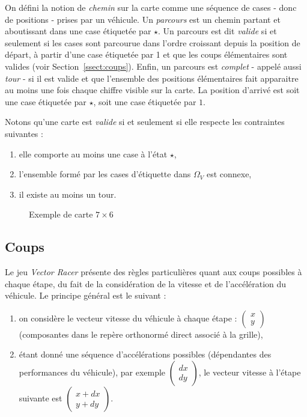 On défini la notion de \textit{chemin} sur la carte comme une séquence de cases - donc de positions - prises par un véhicule. Un \textit{parcours} est un chemin partant et aboutissant dans une case étiquetée par $\star$. Un parcours est dit \textit{valide} si et seulement si les cases sont parcourue dans l'ordre croissant depuis la position de départ, à partir d'une case étiquetée par 1 et que les coups élémentaires sont valides (voir Section~\vref{ssect:coups}). Enfin, un parcours est \textit{complet} - appelé aussi \textit{tour} - si il est valide et que l'ensemble des positions élémentaires fait apparaitre au moins une fois chaque chiffre visible sur la carte. La position d'arrivé est soit une case étiquetée par $\star$, soit une case étiquetée par $1$.

Notons qu'une carte est \textit{valide} si et seulement si elle respecte les contraintes suivantes :
\begin{enumerate}
\item elle comporte au moins une case à l'état $\star$,
\item l'ensemble formé par les cases d'étiquette dans $\Omega_V$ est connexe,
\item il existe au moins un tour.
\end{enumerate}

\begin{figure}[ht]
	\centering
	\theverbbox
	\caption{Exemple de carte $7\times 6$}
	\label{fig:ex_carte}
\end{figure}

\subsection{Coups}
\label{ssect:coups}

Le jeu \textit{Vector Racer} présente des règles particulières quant aux coups possibles à chaque étape, du fait de la considération de la vitesse et de l'accélération du véhicule. Le principe général est le suivant :
\begin{enumerate}
\item on considère le vecteur vitesse du véhicule à chaque étape : $\begin{pmatrix}x\\y\end{pmatrix}$ (composantes dans le repère orthonormé direct associé à la grille),
\item étant donné une séquence d'accélérations possibles (dépendantes des performances du véhicule), par exemple $\begin{pmatrix}dx\\dy\end{pmatrix}$, le vecteur vitesse à l'étape suivante est $\begin{pmatrix}x+dx\\y+dy\end{pmatrix}$.
\end{enumerate}

